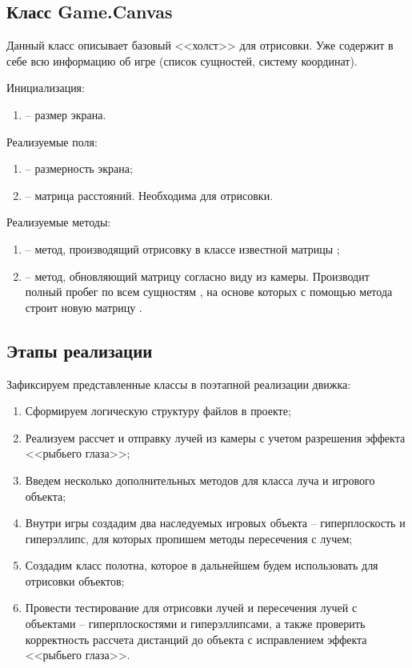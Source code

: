 \subsection{Класс Game.Canvas}

	Данный класс описывает базовый <<холст>> для отрисовки. Уже содержит в себе всю информацию об игре (список сущностей, систему координат).

	\noindent Инициализация:
	\begin{enumerate}
		\item {} -- размер экрана.
	\end{enumerate}

	\noindent Реализуемые поля:
	\begin{enumerate}
		\item {} -- размерность экрана;
		\item {} -- матрица расстояний. Необходима для отрисовки.
	\end{enumerate}

	\noindent Реализуемые методы:
	\begin{enumerate}
		\item {} -- метод, производящий отрисовку в классе  известной матрицы ;
		\item {} -- метод, обновляющий матрицу  согласно виду из камеры. Производит полный пробег по всем сущностям , на основе которых с помощью метода  строит новую матрицу .
	\end{enumerate}


\subsection{Этапы реализации}

	Зафиксируем представленные классы в поэтапной реализации движка:
	\begin{enumerate}
		\item Сформируем логическую структуру файлов в проекте;
		\item Реализуем рассчет и отправку лучей из камеры с учетом разрешения эффекта <<рыбьего глаза>>;
		\item Введем несколько дополнительных методов для класса луча и игрового объекта;
		\item Внутри игры создадим два наследуемых игровых объекта -- гиперплоскость и гиперэллипс, для которых пропишем методы пересечения с лучем;
		\item Создадим класс полотна, которое в дальнейшем будем использовать для отрисовки объектов;
		\item Провести тестирование для отрисовки лучей и пересечения лучей с объектами -- гиперплоскостями и гиперэллипсами, а также проверить корректность рассчета дистанций до объекта с исправлением эффекта <<рыбьего глаза>>.
	\end{enumerate}


